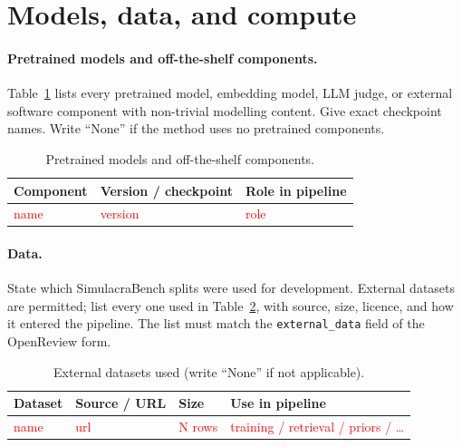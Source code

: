\documentclass{article}
\begin{document}
\section{Models, data, and compute}
\label{sec:resources}

\paragraph{Pretrained models and off-the-shelf components.} Table~\ref{tab:models} lists every pretrained model, embedding model, LLM judge, or external software component with non-trivial modelling content. Give exact checkpoint names. Write ``None'' if the method uses no pretrained components.

\begin{table}[h]
  \centering
  \caption{Pretrained models and off-the-shelf components.}
  \label{tab:models}
  \begin{tabular}{lll}
    \toprule
    Component & Version / checkpoint & Role in pipeline  \\
    \midrule
    \textcolor{red}{name} & \textcolor{red}{version} & \textcolor{red}{role} \\
    \bottomrule
  \end{tabular}
\end{table}

\paragraph{Data.} State which SimulacraBench splits were used for development. External datasets are permitted; list every one used in Table~\ref{tab:external}, with source, size, licence, and how it entered the pipeline. The list must match the \texttt{external\_data} field of the OpenReview form.

\begin{table}[h]
  \centering
  \caption{External datasets used (write ``None'' if not applicable).}
  \label{tab:external}
  \begin{tabular}{llll}
    \toprule
    Dataset & Source / URL & Size & Use in pipeline \\
    \midrule
    \textcolor{red}{name} & \textcolor{red}{url} & \textcolor{red}{N rows} & \textcolor{red}{training / retrieval / priors / \ldots} \\
    \bottomrule
  \end{tabular}
\end{table}
\end{document}
